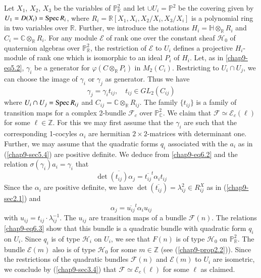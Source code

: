 Let $X_{1}$, $X_{2}$, $X_{3}$ be the variables of
$\mathbb{P}^{2}_{\mathbb{R}}$ and let $\cup U_{i}=\mathbb{P}^{2}$ be
the covering given by $U_{1}=D(X_{i})=\operatorname{Spec} R_{i}$, where
$R_{i}=\mathbb{R}[X_{1},X_{i},X_{2}/X_{i},X_{3}/X_{i}]$ is a
polynomial ring in two variables over $\mathbb{R}$. Further, we
introduce the notations $H_{i}=\mathbb{H}\otimes_{\mathbb{R}}R_{i}$
and $C_{i}=\mathbb{C}\otimes_{\mathbb{R}}R_{i}$. For any module
$\mathscr{E}$ of rank one over the constant sheaf $\mathscr{H}_{0}$ of
quaternion algebras over $\mathbb{P}^{2}_{\mathbb{R}}$, the
restriction of $\mathscr{E}$ to $U_{i}$ defines a projective
$H_{i}$-module of rank one which is isomorphic to an ideal $P_{i}$ of
$H_{i}$. Let, as in \eqref{chap9-eq5.2}, $\gamma_{i}$ be\pageoriginale
a generator for $\varphi(C\otimes_{\mathbb{R}}P_{i})$ in
$M_{2}(C_{i})$. Restricting to $U_{i}\cap U_{j}$, we can choose the
image of $\gamma_{i}$ or $\gamma_{j}$ as generator. Thus we have
\setcounter{equation}{1}
\begin{equation}
\gamma_{j}=\gamma_{i}t_{ij},\quad t_{ij}\in GL_{2}(C_{ij})\label{chap9-eq6.2}
\end{equation}
where $U_{i}\cap U_{j}=\operatorname{Spec} R_{ij}$ and
$C_{ij}=\mathbb{C}\otimes_{\mathbb{R}}R_{ij}$. The family $\{t_{ij}\}$
is a family of transition maps for a complex 2-bundle
$\mathscr{F}_{c}$ over $\mathbb{P}^{2}_{\mathbb{C}}$. We claim that
$\mathscr{F}\simeq \mathscr{E}_{c}(\ell)$ for some
$\ell\in \mathbb{Z}$. For this we may first assume that the
$\gamma_{i}$ are such that the corresponding 1-cocyles $\alpha_{i}$
are hermitian $2\times 2$-matrices with determinant one. Further, we
may assume that the quadratic forms $q_{i}$ associated with the
$a_{i}$ as in (\ref{chap9-sec5.4}) are positive definite. We deduce
from \eqref{chap9-eq6.2} and the relation
$\sigma(\gamma_{i})a_{i}=\gamma_{i}$ that
$$
\det\overline{(t_{ij})}\alpha_{j}=\overline{t_{ij}}^{t}\alpha_{i}t_{ij}
$$
Since the $\alpha_{i}$ are positive definite, we have
$\det(\overline{t_{ij}})=\lambda^{2}_{ij}\in R^{X}_{ij}$ as in
(\ref{chap9-sec2.1}) and
\setcounter{equation}{2}
\begin{equation}
\alpha_{j}=\overline{u_{ij}}^{t}\alpha_{i}u_{ij}\label{chap9-eq6.3}
\end{equation}
with $u_{ij}=t_{ij}\cdot \lambda^{-1}_{ij}$. The $u_{ij}$ are
transition maps of a bundle $\mathscr{F}(n)$. The
relations \eqref{chap9-eq6.3} show that this bundle is a quadratic
bundle with quadratic form $q_{i}$ on $U_{i}$. Since $q_{i}$ is of
type $\mathscr{H}_{i}$ on $U_{i}$, we see that $F(n)$ is of type
$\mathscr{H}_{0}$ on $\mathbb{P}^{2}_{\mathbb{R}}$. The bundle
$\mathscr{E}(m)$ also is of type $\mathscr{H}_{0}$ for some
$m\in \mathbb{Z}$ (see (\ref{chap9-prop2.2})). Since the restrictions
of the quadratic bundles $\mathscr{F}(n)$ and $\mathscr{E}(m)$ to
$U_{i}$ are isometric, we conclude by (\ref{chap9-sec3.4}) that
$\mathscr{F}\simeq \mathscr{E}_{c}(\ell)$ for some $\ell$ as claimed. 

